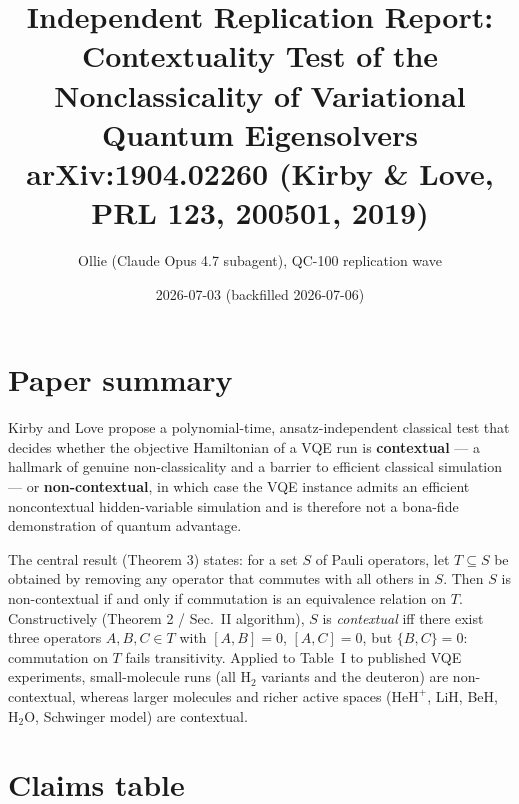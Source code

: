 \documentclass[11pt]{article}
\title{Independent Replication Report:\\
Contextuality Test of the Nonclassicality of Variational Quantum Eigensolvers\\
\large arXiv:1904.02260 (Kirby \& Love, PRL 123, 200501, 2019)}
\author{Ollie (Claude Opus 4.7 subagent), QC-100 replication wave}
\date{2026-07-03 (backfilled 2026-07-06)}
\begin{document}
\maketitle

\section{Paper summary}

Kirby and Love propose a polynomial-time, ansatz-independent classical test
that decides whether the objective Hamiltonian of a VQE run is
\textbf{contextual} --- a hallmark of genuine non-classicality and a barrier
to efficient classical simulation --- or \textbf{non-contextual}, in which case
the VQE instance admits an efficient noncontextual hidden-variable simulation
and is therefore not a bona-fide demonstration of quantum advantage.

The central result (Theorem 3) states: for a set $S$ of Pauli operators, let
$T \subseteq S$ be obtained by removing any operator that commutes with all
others in $S$. Then $S$ is non-contextual if and only if commutation is an
equivalence relation on $T$. Constructively (Theorem 2 / Sec.~II algorithm),
$S$ is \emph{contextual} iff there exist three operators $A, B, C \in T$
with $[A,B]=0$, $[A,C]=0$, but $\{B,C\}=0$: commutation on $T$ fails
transitivity. Applied to Table~I to published VQE experiments, small-molecule
runs (all $\mathrm{H}_2$ variants and the deuteron) are non-contextual,
whereas larger molecules and richer active spaces ($\mathrm{HeH}^+$, LiH,
BeH, $\mathrm{H}_2\mathrm{O}$, Schwinger model) are contextual.

\section{Claims table}
\end{document}
